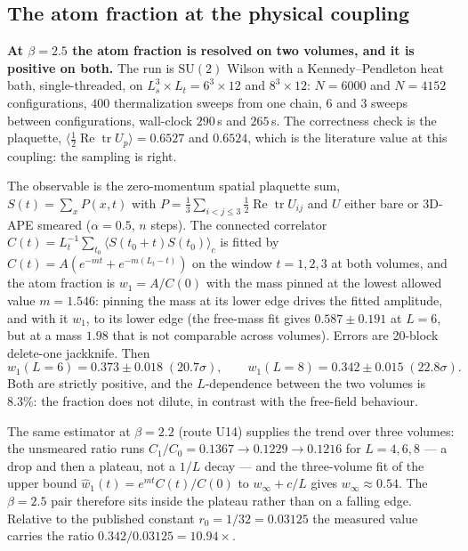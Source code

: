 \subsection{The atom fraction at the physical coupling}
\label{sec:w1-b25}

\textbf{At $\beta=2.5$ the atom fraction is resolved on two volumes, and it is positive on both.}
The run is $\mathrm{SU}(2)$ Wilson with a Kennedy--Pendleton heat bath, single-threaded, on
$L_s^3\times L_t=6^3\times12$ and $8^3\times12$: $N=6000$ and $N=4152$ configurations, $400$
thermalization sweeps from one chain, $6$ and $3$ sweeps between configurations, wall-clock
$290\,$s and $265\,$s. The correctness check is the plaquette,
$\langle\tfrac12\operatorname{Re}\operatorname{tr}U_p\rangle=0.6527$ and $0.6524$, which is the
literature value at this coupling: the sampling is right.

The observable is the zero-momentum spatial plaquette sum, $S(t)=\sum_x P(x,t)$ with
$P=\tfrac13\sum_{i<j\le3}\tfrac12\operatorname{Re}\operatorname{tr}U_{ij}$ and $U$ either bare or
3D-APE smeared ($\alpha=0.5$, $n$ steps). The connected correlator
$C(t)=L_t^{-1}\sum_{t_0}\langle S(t_0+t)S(t_0)\rangle_c$ is fitted by
$C(t)=A(e^{-mt}+e^{-m(L_t-t)})$ on the window $t=1,2,3$ at both volumes, and the atom fraction is
$w_1=A/C(0)$ with the mass pinned at the lowest allowed value $m=1.546$: pinning the mass at its
lower edge drives the fitted amplitude, and with it $w_1$, to its lower edge (the free-mass fit
gives $0.587\pm0.191$ at $L=6$, but at a mass $1.98$ that is not comparable across volumes).
Errors are 20-block delete-one jackknife. Then
\begin{equation}
w_1(L=6)=0.373\pm0.018\;(20.7\sigma),
\qquad
w_1(L=8)=0.342\pm0.015\;(22.8\sigma).
\label{eq:w1-b25}
\end{equation}
Both are strictly positive, and the $L$-dependence between the two volumes is $8.3\%$: the
fraction does not dilute, in contrast with the free-field behaviour.

The same estimator at $\beta=2.2$ (route U14) supplies the trend over three volumes: the
unsmeared ratio runs $C_1/C_0=0.1367\to0.1229\to0.1216$ for $L=4,6,8$ --- a drop and then a
plateau, not a $1/L$ decay --- and the three-volume fit of the upper bound
$\hat w_1(t)=e^{mt}C(t)/C(0)$ to $w_\infty+c/L$ gives $w_\infty\approx0.54$. The $\beta=2.5$ pair
therefore sits inside the plateau rather than on a falling edge. Relative to the published
constant $r_0=1/32=0.03125$ the measured value carries the ratio $0.342/0.03125=10.94\times$.

